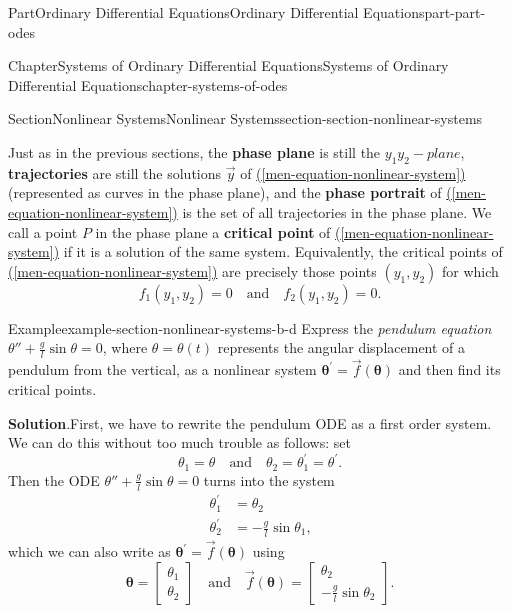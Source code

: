 \documentclass[twoside,10pt,]{book}
\newcommand{\blocktitlefont}{\relax}
\newcommand{\xreffont}{\relax}
\newcommand{\terminology}[1]{\textbf{#1}}
\numberwithin{equation}{part}
\newcommand{\vecm}[1]{\boldsymbol{#1}}
\begin{document}
\begin{partptx}{Part}{Ordinary Differential Equations}{}{Ordinary Differential Equations}{}{}{part-part-odes}
\begin{chapterptx}{Chapter}{Systems of Ordinary Differential Equations}{}{Systems of Ordinary Differential Equations}{}{}{chapter-systems-of-odes}
\begin{sectionptx}{Section}{Nonlinear Systems}{}{Nonlinear Systems}{}{}{section-section-nonlinear-systems}
\begin{introduction}{}
Just as in the previous sections, the \terminology{phase plane} is still the \(y_{1}y_{2}-plane\), \terminology{trajectories} are still the solutions \(\vec{y}\) of \hyperref[men-equation-nonlinear-system]{({\xreffont\ref{men-equation-nonlinear-system}})} (represented as curves in the phase plane), and the \terminology{phase portrait} of \hyperref[men-equation-nonlinear-system]{({\xreffont\ref{men-equation-nonlinear-system}})} is the set of all trajectories in the phase plane. We call a point \(P\) in the phase plane a \terminology{critical point} of \hyperref[men-equation-nonlinear-system]{({\xreffont\ref{men-equation-nonlinear-system}})} if it is a solution of the same system. Equivalently, the critical points of \hyperref[men-equation-nonlinear-system]{({\xreffont\ref{men-equation-nonlinear-system}})} are precisely those points \((y_{1},y_{2})\) for which%
\begin{equation*}
f_{1}(y_{1},y_{2}) = 0\quad\text{and}\quad f_{2}(y_{1},y_{2}) = 0.  
\end{equation*}
%
\begin{example}{Example}{}{example-section-nonlinear-systems-b-d}%
Express the \emph{pendulum equation} \(\theta''+\frac{g}{l}\sin\theta=0\), where \(\theta=\theta(t)\) represents the angular displacement of a pendulum from the vertical, as a nonlinear system \(\vecm{\theta}^\prime = \vec{f}(\vecm{\theta})\) and then find its critical points.%
\par\smallskip%
\noindent\textbf{\blocktitlefont Solution}.\hypertarget{solution-section-nonlinear-systems-b-d-b}{}\quad{}First, we have to rewrite the pendulum ODE as a first order system. We can do this without too much trouble as follows: set%
\begin{equation*}
\theta_{1} = \theta\quad\text{and}\quad\theta_{2} = \theta_{1}^\prime = \theta^\prime\text{.}
\end{equation*}
Then the ODE \(\theta''+\frac{g}{l}\sin\theta = 0\) turns into the system%
\begin{align*}
\theta^\prime_{1} & = \theta_{2}\\
\theta^\prime_{2} & = -\frac{g}{l}\sin\theta_{1}\text{,}
\end{align*}
which we can also write as \(\boldsymbol{\theta}^\prime = \vec{f}(\boldsymbol{\theta})\) using%
\begin{equation*}
\vecm{\theta} = \begin{bmatrix}\theta_{1} \\ \theta_{2}\end{bmatrix}\quad\text{and}\quad \vec{f}(\vecm{\theta}) = \begin{bmatrix}\theta_{2} \\ -\frac{g}{l}\sin\theta_{2}\end{bmatrix}.

\end{equation*}
\end{example}
\end{introduction}
\end{sectionptx}
\end{chapterptx}
\end{partptx}
\end{document}
